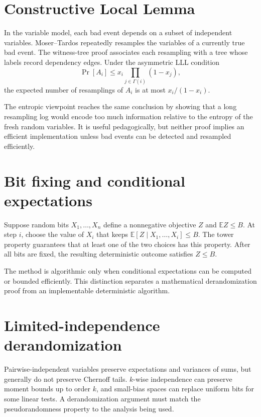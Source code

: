 \section{Constructive Local Lemma}

In the variable model, each bad event depends on a subset of independent
variables.  Moser--Tardos repeatedly resamples the variables of a currently
true bad event.  The witness-tree proof associates each resampling with a
tree whose labels record dependency edges.  Under the asymmetric LLL
condition
\[
 \Pr[A_i]\leq x_i\prod_{j\in\Gamma(i)}(1-x_j),
\]
the expected number of resamplings of $A_i$ is at most $x_i/(1-x_i)$.

The entropic viewpoint reaches the same conclusion by showing that a long
resampling log would encode too much information relative to the entropy of
the fresh random variables.  It is useful pedagogically, but neither proof
implies an efficient implementation unless bad events can be detected and
resampled efficiently.

\section{Bit fixing and conditional expectations}

Suppose random bits $X_1,\ldots,X_n$ define a nonnegative objective $Z$ and
$\mathbb{E}Z\leq B$.  At step $i$, choose the value of $X_i$ that keeps
$\mathbb{E}[Z\mid X_1,\ldots,X_i]\leq B$.  The tower property guarantees that
at least one of the two choices has this property.  After all bits are fixed,
the resulting deterministic outcome satisfies $Z\leq B$.

The method is algorithmic only when conditional expectations can be computed
or bounded efficiently.  This distinction separates a mathematical
derandomization proof from an implementable deterministic algorithm.

\section{Limited-independence derandomization}

Pairwise-independent variables preserve expectations and variances of sums,
but generally do not preserve Chernoff tails.  $k$-wise independence can
preserve moment bounds up to order $k$, and small-bias spaces can replace
uniform bits for some linear tests.  A derandomization argument must match
the pseudorandomness property to the analysis being used.

